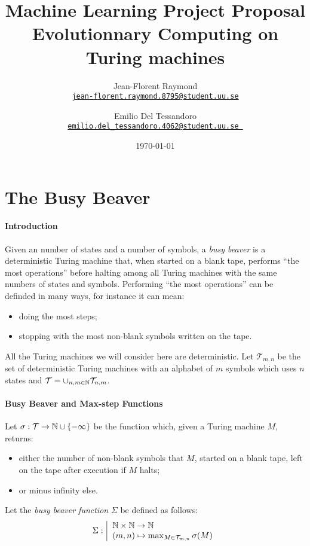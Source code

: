 \documentclass{article}
\title{Machine Learning Project Proposal\\\textbf{Evolutionnary Computing on\\Turing machines}}
\author{Jean-Florent Raymond\\\href{mailto:jean-florent.raymond.8795@student.uu.se}{\texttt{jean-florent.raymond.8795@student.uu.se}} \and Emilio Del Tessandoro\\
\href{mailto:emilio.del_tessandoro.4062@student.uu.se }{\texttt{emilio.del\_tessandoro.4062@student.uu.se }}}
\date{\today}
\begin{document}
\maketitle

\section{The Busy Beaver}

\paragraph{Introduction} Given an number of states and a number of symbols, a \emph{busy beaver} is a deterministic Turing machine that, when started on a blank tape, performs ``the most operations'' before halting among all Turing machines with the same numbers of states and symbols. Performing ``the most operations'' can be definded in many ways, for instance it can mean:
\begin{itemize}
\item doing the most steps;
\item stopping with the most non-blank symbols written on the tape.
\end{itemize}

All the Turing machines we will consider here are deterministic. Let $\mathcal{T}_{m,n}$ be the set of deterministic Turing machines with an alphabet of $m$ symbols which uses $n$ states and $\mathcal{T} = \cup_{n,m \in \mathbb{N}} \mathcal{T}_{n,m}$.


\paragraph{Busy Beaver and Max-step Functions}
Let $\sigma : \mathcal{T} \to \mathbb{N} \cup \{-\infty\}$ be the function which, given a Turing machine $M$, returns:
\begin{itemize}
\item either the number of non-blank symbols that $M$, started on a blank tape, left on the tape after execution if $M$ halts;
\item or minus infinity else.
\end{itemize}

Let the \emph{busy beaver function} $\Sigma$ be defined as follows:
\[
\Sigma : \left |
\begin{array}{l}
\mathbb{N} \times \mathbb{N} \to \mathbb{N}\\
(m,n) \mapsto \max_{M \in \mathcal{T}_{m,n}} \sigma(M)
\end{array}
\right .
\]
\end{document}
